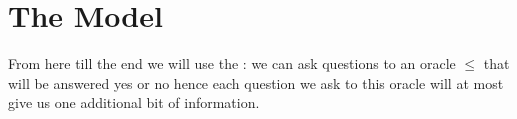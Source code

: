 \section{The Model}
\label{tree:sorting:model}

From here till the end we will use the  : we
can ask questions to an oracle $\le$ that will be answered yes or no hence each
question we ask to this oracle will at most give us one additional bit of
information.
